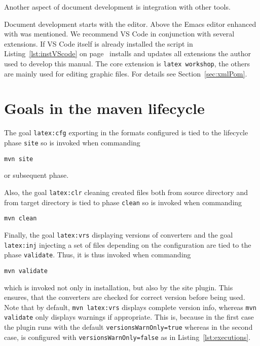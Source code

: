 Another aspect of document development is integration with other tools. 

Document development starts with the editor. 
Above the Emacs editor enhanced with \auctex{} was mentioned. 
We recommend VS Code in conjunction with several extensions. 
If VS Code itself is already installed 
the script in Listing~\ref{lst:instVScode} on page~\pageref{lst:instVScode}  
installs and updates all extensions 
the author used to develop this manual. 
The core extension is \texttt{latex workshop}, 
the others are mainly used for editing graphic files. 
For details see Section~\ref{sec:xmlPom}. 








\section{Goals in the maven lifecycle}\label{sec:usageLifecycle}

The goal \texttt{latex:cfg} exporting in the formats configured
is tied to the lifecycle phase \texttt{site} so is invoked
when commanding
%
\begin{Verbatim}[fontsize=\scriptsize]
mvn site
\end{Verbatim}
%
or subsequent phase.

Also, the goal \texttt{latex:clr} cleaning created files
both from source directory and from target directory
is tied to phase \texttt{clean} so is invoked
when commanding
%
\begin{Verbatim}[fontsize=\scriptsize]
mvn clean
\end{Verbatim}

Finally, the goal \texttt{latex:vrs} displaying versions of converters 
and the goal \texttt{latex:inj} injecting a set of files 
depending on the configuration 
are tied to the phase \texttt{validate}. 
Thus, it is thus invoked when commanding
%
\begin{Verbatim}[fontsize=\scriptsize]
mvn validate
\end{Verbatim}
%
which is invoked not only in installation, but also by the site plugin.
This ensures, that the converters are checked for correct version
before being used. 
Note that by default, \texttt{mvn latex:vrs} displays complete version info,
whereas \texttt{mvn validate} only displays warnings if appropriate. 
This is, because in the first case the plugin runs with the default \texttt{versionsWarnOnly=true} 
whereas in the second case, is configured with \texttt{versionsWarnOnly=false} 
as in Listing~\ref{lst:executions}. 




